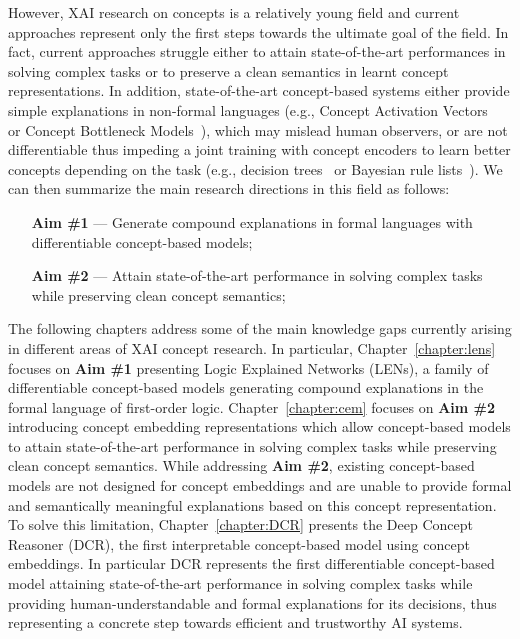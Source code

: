 However, XAI research on concepts is a relatively young field and current approaches represent only the first steps towards the ultimate goal of the field. In fact, current approaches struggle either to attain state-of-the-art performances in solving complex tasks or to preserve a clean semantics in learnt concept representations. In addition, state-of-the-art concept-based systems either provide simple explanations in non-formal languages (e.g., Concept Activation Vectors~\cite{kim2018interpretability} or Concept Bottleneck Models~\cite{koh2020concept}), which may mislead human observers, or are not differentiable thus impeding a joint training with concept encoders to learn better concepts depending on the task (e.g., decision trees~\cite{breiman1984classification} or Bayesian rule lists~\cite{letham2015interpretable}). 
We can then summarize the main research directions in this field as follows:
\begin{enumerate}
    \item[\textbf{Aim \#1}]--- Generate compound explanations in formal languages with differentiable concept-based models;
    \item[\textbf{Aim \#2}]--- Attain state-of-the-art performance in solving complex tasks while preserving clean concept semantics;
\end{enumerate}

The following chapters address some of the main knowledge gaps currently arising in different areas of XAI concept research. In particular, Chapter~\ref{chapter:lens} focuses on \textbf{Aim \#1} presenting Logic Explained Networks (LENs), a family of differentiable concept-based models generating compound explanations in the formal language of first-order logic. Chapter~\ref{chapter:cem} focuses on \textbf{Aim \#2} introducing concept embedding representations which allow concept-based models to attain state-of-the-art performance in solving complex tasks while preserving clean concept semantics. While addressing \textbf{Aim \#2}, existing concept-based models are not designed for concept embeddings and are unable to provide formal and semantically meaningful explanations based on this concept representation. To solve this limitation, Chapter~\ref{chapter:DCR} presents the Deep Concept Reasoner (DCR), the first interpretable concept-based model using concept embeddings. In particular DCR represents the first differentiable concept-based model attaining state-of-the-art performance in solving complex tasks while providing human-understandable and formal explanations for its decisions, thus representing a concrete step towards efficient and trustworthy AI systems.


